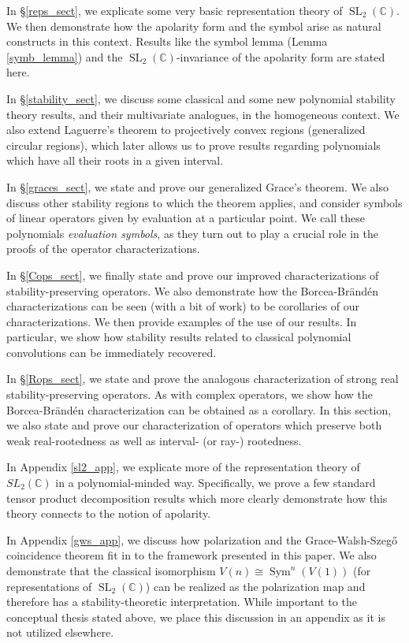 \documentclass{article}
\theoremstyle{definition}
\theoremstyle{plain}
\newcommand{\C}{\mathbb{C}}
\DeclareMathOperator{\SL}{SL}
\begin{document}
In \S\ref{reps_sect}, we explicate some very basic representation theory of $\SL_2(\C)$. We then demonstrate how the apolarity form and the symbol arise as natural constructs in this context. Results like the symbol lemma (Lemma \ref{symb_lemma}) and the $\SL_2(\C)$-invariance of the apolarity form are stated here.

In \S\ref{stability_sect}, we discuss some classical and some new polynomial stability theory results, and their multivariate analogues, in the homogeneous context. We also extend Laguerre's theorem to projectively convex regions (generalized circular regions), which later allows us to prove results regarding polynomials which have all their roots in a given interval. 

In \S\ref{graces_sect}, we state and prove our generalized Grace's theorem. We also discuss other stability regions to which the theorem applies, and consider symbols of linear operators given by evaluation at a particular point. We call these polynomials \emph{evaluation symbols}, as they turn out to play a crucial role in the proofs of the operator characterizations.

In \S\ref{Cops_sect}, we finally state and prove our improved characterizations of stability-preserving operators. We also demonstrate how the Borcea-Br{\"a}nd{\'e}n characterizations can be seen (with a bit of work) to be corollaries of our characterizations. We then provide examples of the use of our results. In particular, we show how stability results related to classical polynomial convolutions can be immediately recovered.

In \S\ref{Rops_sect}, we state and prove the analogous characterization of strong real stability-preserving operators. As with complex operators, we show how the Borcea-Br{\"a}nd{\'e}n characterization can be obtained as a corollary. In this section, we also state and prove our characterization of operators which preserve both weak real-rootedness as well as interval- (or ray-) rootedness.

In Appendix \ref{sl2_app}, we explicate more of the representation theory of $SL_2(\C)$ in a polynomial-minded way. Specifically, we prove a few standard tensor product decomposition results which more clearly demonstrate how this theory connects to the notion of apolarity.

In Appendix \ref{gws_app}, we discuss how polarization and the Grace-Walsh-Szeg{\H{o}} coincidence theorem fit in to the framework presented in this paper. We also demonstrate that the classical isomorphism $V(n) \cong \operatorname{Sym}^n(V(1))$ (for representations of $\SL_2(\C)$) can be realized as the polarization map and therefore has a stability-theoretic interpretation. While important to the conceptual thesis stated above, we place this discussion in an appendix as it is not utilized elsewhere.
\end{document}
